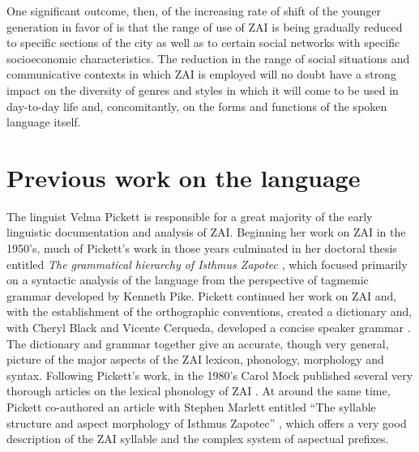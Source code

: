 One significant outcome, then, of the increasing rate of shift of the younger generation in favor of  is that the range of use of ZAI is being gradually reduced to specific sections of the city as well as to certain social networks with specific socioeconomic characteristics. The reduction in the range of social situations and communicative contexts in which ZAI is employed will no doubt have a strong impact on the diversity of genres and styles in which it will come to be used in day-to-day life and, concomitantly, on the forms and functions of the spoken language itself.



\section{Previous work on the language}

The linguist Velma Pickett is responsible for a great majority of the early linguistic documentation and analysis of ZAI.  Beginning her work on ZAI in the 1950's, much of Pickett's work in those years culminated in her doctoral thesis entitled \textit{The grammatical hierarchy of Isthmus Zapotec} \citep{pickett1960}, which focused primarily on a syntactic analysis of the language from the perspective of tagmemic grammar developed by Kenneth Pike. Pickett continued her work on ZAI and, with the establishment of the orthographic conventions, created a dictionary \citep{pickett1979} and, with Cheryl Black and Vicente Cerqueda, developed a concise speaker grammar \citep{pickett1998}. The dictionary and grammar together give an accurate, though very general, picture of the major aspects of the ZAI lexicon, phonology, morphology and syntax. Following Pickett's work, in the 1980's Carol Mock published several very thorough articles on the lexical phonology of ZAI \citep{mock1983,mock1985a,mock1985b,mock1988}. At around the same time, Pickett co-authored an article with Stephen Marlett entitled ``The syllable structure and aspect morphology of Isthmus Zapotec'' \citep{marlett1987}, which offers a very good description of the ZAI syllable and the complex system of aspectual prefixes. 

